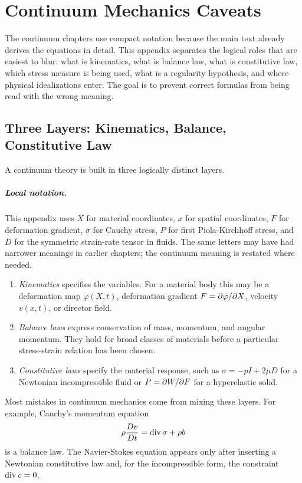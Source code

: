\chapter{Continuum Mechanics Caveats}
\label{app:continuum-caveats}

The continuum chapters use compact notation because the main text already
derives the equations in detail.  This appendix separates the logical roles
that are easiest to blur: what is kinematics, what is balance law, what is
constitutive law, which stress measure is being used, what is a regularity
hypothesis, and where physical idealizations enter.  The goal is to prevent
correct formulas from being read with the wrong meaning.

\section{Three Layers: Kinematics, Balance, Constitutive Law}
\label{sec:continuum-three-layers}

A continuum theory is built in three logically distinct layers.

\paragraph{Local notation.}
This appendix uses \(X\) for material coordinates, \(x\) for spatial
coordinates, \(F\) for deformation gradient, \(\sigma\) for Cauchy stress,
\(P\) for first Piola-Kirchhoff stress, and \(D\) for the symmetric
strain-rate tensor in fluids.  The same letters may have had narrower meanings
in earlier chapters; the continuum meaning is restated where needed.

\begin{enumerate}
\item \emph{Kinematics} specifies the variables.  For a material body this may
be a deformation map \(\varphi(X,t)\), deformation gradient
\(F=\partial\varphi/\partial X\), velocity \(v(x,t)\), or director field.
\item \emph{Balance laws} express conservation of mass, momentum, and angular
momentum.  They hold for broad classes of materials before a particular
stress-strain relation has been chosen.
\item \emph{Constitutive laws} specify the material response, such as
\(\sigma=-pI+2\mu D\) for a Newtonian incompressible fluid or
\(P=\partial W/\partial F\) for a hyperelastic solid.
\end{enumerate}

Most mistakes in continuum mechanics come from mixing these layers.  For
example, Cauchy's momentum equation
\[
        \rho\frac{D v}{D t}=\operatorname{div}\sigma+\rho b
\]
is a balance law.  The Navier-Stokes equation appears only after inserting a
Newtonian constitutive law and, for the incompressible form, the constraint
\(\operatorname{div} v=0\).

